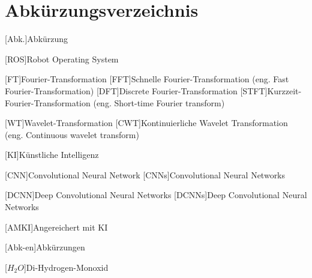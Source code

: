 
\chapter*{Abkürzungsverzeichnis}                   %

\begin{acronym}[DHBW]
 [Abk.]{Abkürzung}
 
 [ROS]{Robot Operating System}
 
 [FT]{Fourier-Transformation}
 [FFT]{Schnelle Fourier-Transformation (eng. Fast Fourier-Transformation)}
 [DFT]{Discrete Fourier-Transformation}
 [STFT]{Kurzzeit-Fourier-Transformation (eng. Short-time Fourier transform) }
 
 [WT]{Wavelet-Transformation}
 [CWT]{Kontinuierliche Wavelet Transformation (eng. Continuous wavelet transform)}

 
 [KI]{Künstliche Intelligenz}

 [CNN]{Convolutional Neural Network}
 [CNNs]{Convolutional Neural Networks}

 [DCNN]{Deep Convolutional Neural Networks}
 [DCNNs]{Deep Convolutional Neural Networks}

 [AMKI]{Angereichert mit KI}
 
 [Abk-en]{Abkürzungen}

 [\ensuremath{H_2O}]{Di-Hydrogen-Monoxid}


\end{acronym}
